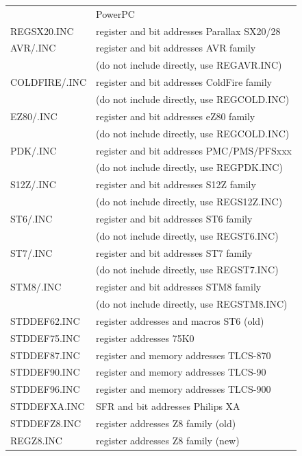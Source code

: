 \documentclass[12pt,twoside]{report}
\begin{document}
\begin{center}
\begin{longtable}{|l|l|}
                  & PowerPC \\
REGSX20.INC       & register and bit addresses Parallax SX20/28 \\
AVR/\*.INC        & register and bit addresses AVR family \\
                  & (do not include directly, use REGAVR.INC) \\
COLDFIRE/\*.INC   & register and bit addresses ColdFire family \\
                  & (do not include directly, use REGCOLD.INC) \\
EZ80/\*.INC       & register and bit addresses eZ80 family \\
                  & (do not include directly, use REGCOLD.INC) \\
PDK/\*.INC        & register and bit addresses PMC/PMS/PFSxxx \\
                  & (do not include directly, use REGPDK.INC) \\
S12Z/\*.INC       & register and bit addresses S12Z family \\
                  & (do not include directly, use REGS12Z.INC) \\
ST6/\*.INC        & register and bit addresses ST6 family \\
                  & (do not include directly, use REGST6.INC) \\
ST7/\*.INC        & register and bit addresses ST7 family \\
                  & (do not include directly, use REGST7.INC) \\
STM8/\*.INC       & register and bit addresses STM8 family \\
                  & (do not include directly, use REGSTM8.INC) \\
STDDEF62.INC      & register addresses and macros ST6 (old)\\
STDDEF75.INC      & register addresses 75K0 \\
STDDEF87.INC      & register and memory addresses TLCS-870 \\
STDDEF90.INC      & register and memory addresses TLCS-90 \\
STDDEF96.INC      & register and memory addresses TLCS-900 \\
STDDEFXA.INC      & SFR and bit addresses Philips XA \\
STDDEFZ8.INC      & register addresses Z8 family (old) \\
REGZ8.INC         & register addresses Z8 family (new) \\

\end{longtable}
\end{center}
\end{document}
